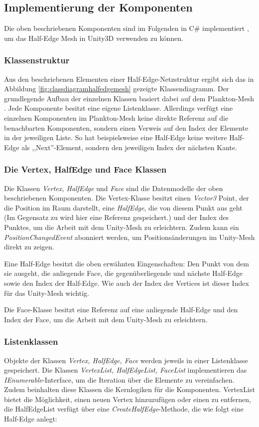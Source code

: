 \subsection{Implementierung der Komponenten}
Die oben beschriebenen Komponenten sind im Folgenden in C\# implementiert \cite{HalfEdgedMeshRepository}, um das Half-Edge Mesh in Unity3D verwenden zu k\"onnen. 

\subsubsection{Klassenstruktur}
Aus den beschriebenen Elementen einer Half-Edge-Netzstruktur ergibt sich das in Abbildung \ref{fig:classdiagramhalfedgemesh} gezeigte Klassendiagramm. Der grundlegende Aufbau der einzelnen Klassen basiert dabei auf dem Plankton-Mesh \cite{Meshmash2017}. Jede Komponente besitzt eine eigene Listenklasse. Allerdings verf\"ugt eine einzelnen Komponenten im Plankton-Mesh keine direkte Referenz auf die benachbarten Komponenten, sondern einen Verweis auf den Index der Elemente in der jeweiligen Liste. So hat beispielsweise eine Half-Edge keine weitere Half-Edge als ,,Next''-Element, sondern den jeweiligen Index der n\"achsten Kante. 

\subsubsection{Die Vertex, HalfEdge und Face Klassen}
Die Klassen \textit{Vertex, HalfEdge} und \textit{Face} sind die Datenmodelle der oben beschriebenen Komponenten. Die Vertex-Klasse besitzt einen \textit{Vector3} Point, der die Position im Raum darstellt, eine \textit{HalfEdge}, die von diesem Punkt aus geht (Im Gegensatz zu \cite{Meshmash2017} wird hier eine Referenz gespeichert.) und der Index des Punktes, um die Arbeit mit dem Unity-Mesh zu erleichtern. Zudem kann ein \textit{PositionChangedEvent} abonniert werden, um Positions\"anderungen im Unity-Mesh direkt zu zeigen.

Eine Half-Edge besitzt die oben erw\"ahnten Eingenschaften: Den Punkt von dem sie ausgeht, die anliegende Face, die gegen\"uberliegende und n\"achste Half-Edge sowie den Index der Half-Edge. Wie auch der Index der Vertices ist dieser Index f\"ur das Unity-Mesh wichtig.

Die Face-Klasse besitzt eine Referenz auf eine anliegende Half-Edge und den Index der Face, um die Arbeit mit dem Unity-Mesh zu erleichtern.

\subsubsection{Listenklassen}
Objekte der Klassen \textit{Vertex, HalfEdge, Face} werden jeweils in einer Listenklasse gespeichert. Die Klassen \textit{VertexList, HalfEdgeList, FaceList} implementieren das \textit{IEnumerable}-Interface, um die Iteration \"uber die Elemente zu vereinfachen. Zudem beinhalten diese Klassen die Kernlogiken f\"ur die Komponenten. VertexList bietet die M\"oglichkeit, einen neuen Vertex hinzuzuf\"ugen oder einen zu entfernen, die HalfEdgeList verf\"ugt \"uber eine  \textit{CreateHalfEdge}-Methode, die wie folgt eine Half-Edge anlegt:

